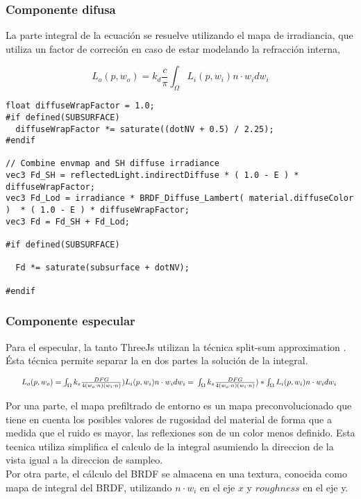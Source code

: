     \subsubsection{Componente difusa}
      La parte integral de la ecuaci\'on se resuelve utilizando el mapa de irradiancia,
      que utiliza un factor de correci\'on en caso de estar modelando la refracci\'on interna,

      $$
      L_o(p, w_o) = k_d \frac{c}{\pi} \int_{\Omega}{L_i(p, w_i) n\cdot{w_i}dw_i}{}
      $$

      \begin{lstlisting}
float diffuseWrapFactor = 1.0;
#if defined(SUBSURFACE)
  diffuseWrapFactor *= saturate((dotNV + 0.5) / 2.25);
#endif

// Combine envmap and SH diffuse irradiance
vec3 Fd_SH = reflectedLight.indirectDiffuse * ( 1.0 - E ) * diffuseWrapFactor;
vec3 Fd_Lod = irradiance * BRDF_Diffuse_Lambert( material.diffuseColor )  * ( 1.0 - E ) * diffuseWrapFactor;
vec3 Fd = Fd_SH + Fd_Lod;

#if defined(SUBSURFACE)

  Fd *= saturate(subsurface + dotNV);

#endif
      \end{lstlisting}
      \singlespacing

    \subsubsection{Componente especular}
    \bgroup
      Para el especular, la tanto ThreeJs utilizan la t\'ecnica split-sum approximation
      \autocite{splitsum}. \'Esta t\'ecnica permite separar la en dos partes la soluci\'on de la
      integral.

      \begin{equation}
        \resizebox{0.95\hsize}{!}{%
        $L_o(p, w_o) =
        \int_{\Omega} k_s \frac{DFG}{4(w_o\cdot{n})(w_i\cdot{n})})L_i(p, w_i)n\cdot{w_i}dw_i = \\
        \int_{\Omega} k_s \frac{DFG}{4(w_o\cdot{n})(w_i\cdot{n})}) *
        \int_{\Omega}L_i(p, w_i)n\cdot{w_i}dw_i$   
        }
      \end{equation}
      \singlespacing

      Por una parte, el mapa prefiltrado de entorno es un mapa preconvolucionado que tiene en cuenta
      los posibles valores de rugosidad del material de forma que a medida que el ruido es mayor, las
      reflexiones son de un color menos definido. Esta tecnica utiliza simplifica el calculo de
      la integral asumiendo la direccion de la vista igual a la direccion de sampleo.\\
      Por otra parte, el c\'alculo del BRDF se almacena en una textura, conocida como mapa de integral
      del BRDF, utilizando $n\cdot{w_i}$ en el eje $x$ y $roughness$ en el eje y.

